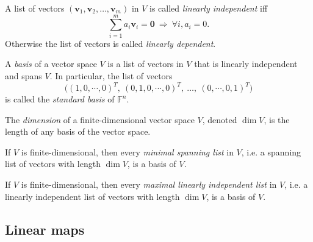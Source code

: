  \begin{defn}
   \label{def:linearIndependent}
   A list of vectors $(\mathbf{v}_1, \mathbf{v}_2, \ldots,
   \mathbf{v}_m)$
   in $V$ is called \emph{linearly independent}
   iff
   \begin{equation}
     \label{eq:linearIndependent}
     \sum_{i=1}^m a_i \mathbf{v}_i = \mathbf{0}
     \ \Rightarrow\ \forall i, a_i=0.
   \end{equation}
   Otherwise the list of vectors is called \emph{linearly dependent}.
 \end{defn}

 \begin{defn}
   A \emph{basis} of a vector space $V$ 
    is a list of vectors in $V$ 
    that is linearly independent
     and spans $V$.
   In particular, the list of vectors
   \begin{equation}
     \label{eq:standardBasis}
     \bigl((1,0,\cdots,0)^T,\  (0,1,0,\cdots,0)^T,\ 
     \ldots,\ (0,\cdots,0, 1)^T\bigr)
   \end{equation}
    is called the \emph{standard basis} of $\mathbb{F}^n$.
 \end{defn}

 \begin{defn}
   The \emph{dimension} of a finite-dimensional vector space
    $V$,
    denoted $\dim V$,
    is the length of any basis of the vector space.
 \end{defn}

 \begin{thm}
   If $V$ is finite-dimensional,
    then every \emph{minimal spanning list} in $V$,
    i.e. a spanning list of vectors with length $\dim V$,
    is a basis of $V$.
 \end{thm}

 \begin{thm}
   \label{thm:linearIndependentListWithDimNIsABasis}
   If $V$ is finite-dimensional,
    then every \emph{maximal linearly independent list} in $V$,
    i.e. a linearly independent list of vectors
    with length $\dim V$, 
    is a basis of $V$.
 \end{thm}

\subsection{Linear maps}
\label{sec:linear-maps}

